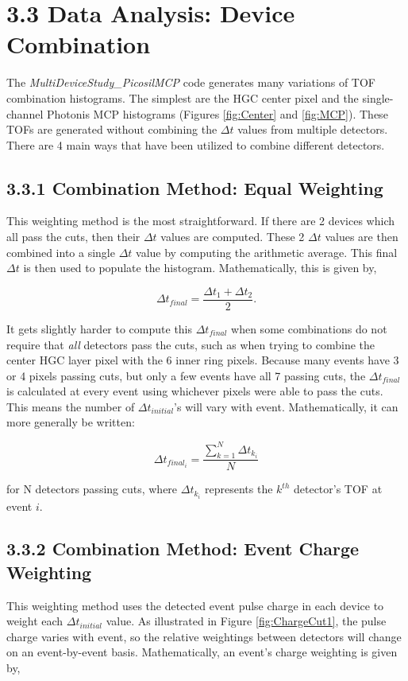 \documentclass[12pt]{article}
\begin{document}
\section*{3.3 Data Analysis: Device Combination}
The \textit{MultiDeviceStudy\_PicosilMCP} code generates many variations of TOF combination histograms. 
The simplest are the HGC center pixel and the single-channel Photonis MCP histograms (Figures \ref{fig:Center} and \ref{fig:MCP}). 
These TOFs are generated without combining the $\Delta t$ values from multiple detectors. 
There are 4 main ways that have been utilized to combine different detectors.

\subsection*{3.3.1 Combination Method: Equal Weighting}
This weighting method is the most straightforward. 
If there are 2 devices which all pass the cuts, then their $\Delta t$ values are computed. 
These 2 $\Delta t$ values are then combined into a single $\Delta t$ value by computing the arithmetic average. 
This final $\Delta t$ is then used to populate the histogram. 
Mathematically, this is given by,

\[
\Delta t_{final} =
\dfrac{\Delta t_1 + \Delta t_2}{2} .
\]

It gets slightly harder to compute this $\Delta t_{final}$ when some combinations do not require that \textit{all} detectors pass the cuts, such as when trying to combine the center HGC layer pixel with the 6 inner ring pixels. 
Because many events have 3 or 4 pixels passing cuts, but only a few events have all 7 passing cuts, the $\Delta t_{final}$ is calculated at every event using whichever pixels were able to pass the cuts. 
This means the number of $\Delta t_{initial}$'s will vary with event. 
Mathematically, it can more generally be written:

\[
\Delta t_{final_i} =
\dfrac{\sum\limits_{k=1}^N \Delta t_{k_i}} {N} 
\]

for N detectors passing cuts, where $\Delta t_{k_i}$ represents the $k^{th}$ detector's TOF at event $i$.

\subsection*{3.3.2 Combination Method: Event Charge Weighting}
This weighting method uses the detected event pulse charge in each device to weight each $\Delta t_{initial}$ value. 
As illustrated in Figure \ref{fig:ChargeCut1}, the pulse charge varies with event, so the relative weightings between detectors will change on an event-by-event basis. 
Mathematically, an event's charge weighting is given by,
\end{document}
